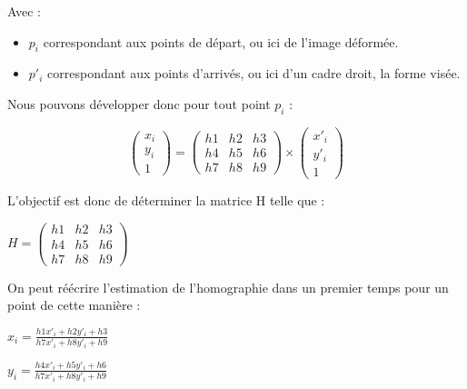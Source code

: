         Avec :

        \begin{itemize}
            \item $ p_i $ correspondant aux points de départ, ou ici de l'image déformée.
            \item $ p'_i $ correspondant aux points d'arrivés, ou ici d'un cadre droit, la forme visée.
        \end{itemize}
            
        Nous pouvons développer donc pour tout point $p_i$ :
    
        \[
            \begin{pmatrix}
                x_i \\
                y_i \\
                1      
            \end{pmatrix}
            = 
            \begin{pmatrix}
                h1 & h2 & h3 \\
                h4 & h5 & h6 \\
                h7 & h8 & h9      
            \end{pmatrix} 
            \times
            \begin{pmatrix}
                x'_i \\
                y'_i \\
                1      
            \end{pmatrix}
            \]
        
        L'objectif est donc de déterminer la matrice H telle que :
    
        \begin{center}
        $ H = \begin{pmatrix} h1 & h2 & h3 \\ h4 & h5 & h6 \\ h7 & h8 & h9 \end{pmatrix} $
        \end{center}
    
        On peut réécrire l'estimation de l'homographie dans un premier temps pour un point de cette manière :

        \begin{center}
            $x_i = \frac{h1x'_i + h2y'_i + h3}{h7x'_i + h8y'_i + h9} $  
        \end{center}
    
        \begin{center}
            $y_i = \frac{h4x'_i + h5y'_i + h6}{h7x'_i + h8y'_i + h9} $
        \end{center}
    
